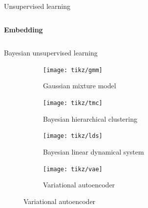 \documentclass[10pt, compress]{beamer}
\begin{document}
\begin{frame}{Unsupervised learning}
\begin{columns}[T]
    \begin{column}{0.5\textwidth}
      \begin{overlayarea}{\textwidth}{5cm}
        \centering
        \Large \textbf{Embedding} \\ \vspace{10pt}
      \end{overlayarea}
    \end{column}
  \end{columns}
\end{frame}

\begin{frame}{Bayesian unsupervised learning}
  \centering
  \begin{figure}
    \centering
    \pause
    \begin{subfigure}[t]{0.20\textwidth}
        \centering
        \texttt{[image: tikz/gmm]}
        \caption{Gaussian mixture model}
    \end{subfigure}
    \pause
    \hfill
    \begin{subfigure}[t]{0.20\textwidth}
        \centering
        \texttt{[image: tikz/tmc]}
        \caption{Bayesian hierarchical clustering}
    \end{subfigure}
    \pause
    \hfill
    \begin{subfigure}[t]{0.20\textwidth}
        \centering
        \texttt{[image: tikz/lds]}
        \caption{Bayesian linear dynamical system}
    \end{subfigure}
    \pause
    \begin{subfigure}[t]{0.20\textwidth}
        \centering
        \texttt{[image: tikz/vae]}
        \caption{Variational autoencoder}
    \end{subfigure}
  \end{figure}
\end{frame}
\end{document}
